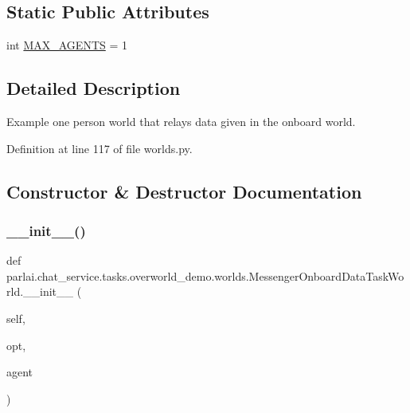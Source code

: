 \subsection*{Static Public Attributes}
\begin{DoxyCompactItemize}
\item 
int \hyperlink{classparlai_1_1chat__service_1_1tasks_1_1overworld__demo_1_1worlds_1_1MessengerOnboardDataTaskWorld_a7ed8e27cd48ad50a7625737800cc6779}{M\+A\+X\+\_\+\+A\+G\+E\+N\+TS} = 1
\end{DoxyCompactItemize}


\subsection{Detailed Description}
\begin{DoxyVerb}Example one person world that relays data given in the onboard world.
\end{DoxyVerb}
 

Definition at line 117 of file worlds.\+py.



\subsection{Constructor \& Destructor Documentation}
\mbox{\label{classparlai_1_1chat__service_1_1tasks_1_1overworld__demo_1_1worlds_1_1MessengerOnboardDataTaskWorld_a2a6af8dfc01b563104a8ec6af83711bc}} 
\subsubsection{\texorpdfstring{\+\_\+\+\_\+init\+\_\+\+\_\+()}{\_\_init\_\_()}}
{\footnotesize\ttfamily def parlai.\+chat\+\_\+service.\+tasks.\+overworld\+\_\+demo.\+worlds.\+Messenger\+Onboard\+Data\+Task\+World.\+\_\+\+\_\+init\+\_\+\+\_\+ (\begin{DoxyParamCaption}\item[{}]{self,  }\item[{}]{opt,  }\item[{}]{agent }\end{DoxyParamCaption})}



